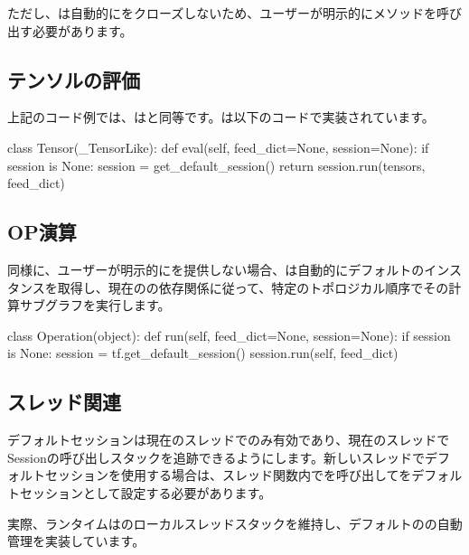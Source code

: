 \begin{content}
\begin{content}
ただし、は自動的にをクローズしないため、ユーザーが明示的にメソッドを呼び出す必要があります。

\subsection{テンソルの評価}

上記のコード例では、はと同等です。は以下のコードで実装されています。

\begin{leftbar}
\begin{python}
class Tensor(_TensorLike):
  def eval(self, feed_dict=None, session=None):
    if session is None:
      session = get_default_session()
    return session.run(tensors, feed_dict)
\end{python}
\end{leftbar}

\subsection{OP演算}

同様に、ユーザーが明示的にを提供しない場合、は自動的にデフォルトのインスタンスを取得し、現在のの依存関係に従って、特定のトポロジカル順序でその計算サブグラフを実行します。

\begin{leftbar}
\begin{python}
class Operation(object):
  def run(self, feed_dict=None, session=None):
    if session is None:
      session = tf.get_default_session()
    session.run(self, feed_dict)
\end{python}
\end{leftbar}

\subsection{スレッド関連}

デフォルトセッションは現在のスレッドでのみ有効であり、現在のスレッドでSessionの呼び出しスタックを追跡できるようにします。新しいスレッドでデフォルトセッションを使用する場合は、スレッド関数内でを呼び出してをデフォルトセッションとして設定する必要があります。

実際、ランタイムはのローカルスレッドスタックを維持し、デフォルトのの自動管理を実装しています。


\end{content}
\end{content}
